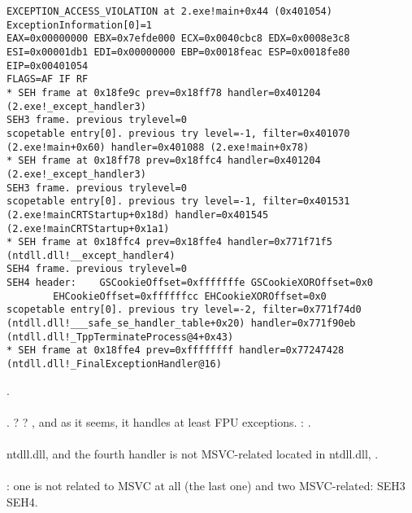 \begin{lstlisting}[caption=tracer.exe output]
EXCEPTION_ACCESS_VIOLATION at 2.exe!main+0x44 (0x401054) ExceptionInformation[0]=1
EAX=0x00000000 EBX=0x7efde000 ECX=0x0040cbc8 EDX=0x0008e3c8
ESI=0x00001db1 EDI=0x00000000 EBP=0x0018feac ESP=0x0018fe80
EIP=0x00401054
FLAGS=AF IF RF
* SEH frame at 0x18fe9c prev=0x18ff78 handler=0x401204 (2.exe!_except_handler3)
SEH3 frame. previous trylevel=0
scopetable entry[0]. previous try level=-1, filter=0x401070 (2.exe!main+0x60) handler=0x401088 (2.exe!main+0x78)
* SEH frame at 0x18ff78 prev=0x18ffc4 handler=0x401204 (2.exe!_except_handler3)
SEH3 frame. previous trylevel=0
scopetable entry[0]. previous try level=-1, filter=0x401531 (2.exe!mainCRTStartup+0x18d) handler=0x401545 (2.exe!mainCRTStartup+0x1a1)
* SEH frame at 0x18ffc4 prev=0x18ffe4 handler=0x771f71f5 (ntdll.dll!__except_handler4)
SEH4 frame. previous trylevel=0
SEH4 header:	GSCookieOffset=0xfffffffe GSCookieXOROffset=0x0
		EHCookieOffset=0xffffffcc EHCookieXOROffset=0x0
scopetable entry[0]. previous try level=-2, filter=0x771f74d0 (ntdll.dll!___safe_se_handler_table+0x20) handler=0x771f90eb (ntdll.dll!_TppTerminateProcess@4+0x43)
* SEH frame at 0x18ffe4 prev=0xffffffff handler=0x77247428 (ntdll.dll!_FinalExceptionHandler@16)
\end{lstlisting}

.\\
\\
. ?
?
, 
{and as it seems, it handles at least \ac{FPU} exceptions}.
: .\\
\\
 ntdll.dll, 
{and the fourth handler is not MSVC-related located in} ntdll.dll,
.\\
\\
:
{one is not related to MSVC at all (the last one) and two MSVC-related}: SEH3 \AndENRU SEH4.

